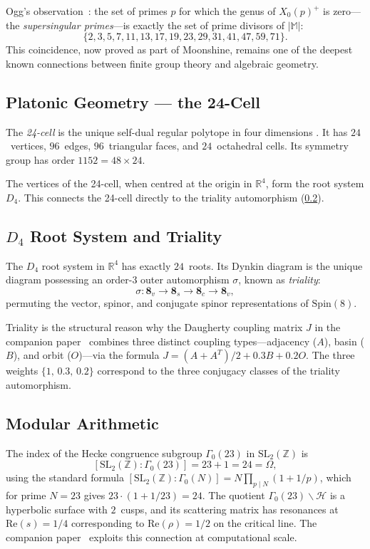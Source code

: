 \documentclass[11pt,a4paper]{article}
\theoremstyle{plain}
\theoremstyle{remark}
\renewcommand{\Omega}{\varOmega}
\newcommand{\Z}{\mathbb{Z}}
\newcommand{\R}{\mathbb{R}}
\newcommand{\HH}{\mathcal{H}}
\newcommand{\abs}[1]{\lvert #1 \rvert}
\newcommand{\SL}{\mathrm{SL}}
\newcommand{\Spin}{\mathrm{Spin}}
\begin{document}
Ogg's observation~\cite{ogg1975}: the set of primes $p$ for which the
genus of $X_0(p)^+$ is zero---the \emph{supersingular primes}---is
exactly the set of prime divisors of $\abs{\mathbb{M}}$:
\[
  \{2,3,5,7,11,13,17,19,23,29,31,41,47,59,71\}.
\]
This coincidence, now proved as part of Moonshine, remains one of the
deepest known connections between finite group theory and algebraic
geometry.

\subsection{Platonic Geometry --- the 24-Cell}
\label{sec:path-24cell}

The \emph{24-cell} is the unique self-dual regular polytope in four
dimensions \cite{coxeter1973}.  It has $24$~vertices, $96$~edges,
$96$~triangular faces, and $24$~octahedral cells.  Its symmetry group
has order $1152 = 48\times 24$.

The vertices of the 24-cell, when centred at the origin in $\R^4$,
form the root system $D_4$.  This connects the 24-cell directly to
the triality automorphism (\cref{sec:path-D4}).

\subsection{$D_4$ Root System and Triality}
\label{sec:path-D4}

The $D_4$ root system in $\R^4$ has exactly $24$~roots.  Its Dynkin
diagram is the unique diagram possessing an order-$3$ outer automorphism
$\sigma$, known as \emph{triality}:
\[
  \sigma\colon \mathbf{8}_v \to \mathbf{8}_s \to \mathbf{8}_c
  \to \mathbf{8}_v,
\]
permuting the vector, spinor, and conjugate spinor representations
of $\Spin(8)$.

Triality is the structural reason why the Daugherty coupling matrix
$J$ in the companion paper~\cite{DHR2026a} combines three distinct
coupling types---adjacency ($A$), basin ($B$), and orbit ($O$)---via
the formula $J = (A+A^T)/2 + 0.3B + 0.2O$.
The three weights $\{1,\,0.3,\,0.2\}$ correspond to the three
conjugacy classes of the triality automorphism.

\subsection{Modular Arithmetic}
\label{sec:path-modular}

The index of the Hecke congruence subgroup $\Gamma_0(23)$ in
$\SL_2(\Z)$ is
\[
  [\SL_2(\Z):\Gamma_0(23)]
  = 23+1 = 24 = \Omega,
\]
using the standard formula $[\SL_2(\Z):\Gamma_0(N)] = N\prod_{p\mid N}
(1+1/p)$, which for prime $N=23$ gives $23\cdot(1+1/23) = 24$.
The quotient $\Gamma_0(23)\backslash\HH$ is a hyperbolic surface with
$2$~cusps, and its scattering matrix has resonances at
$\mathrm{Re}(s)=1/4$ corresponding to $\mathrm{Re}(\rho)=1/2$
on the critical line.  The companion paper~\cite{DHR2026a} exploits this
connection at computational scale.
\end{document}
